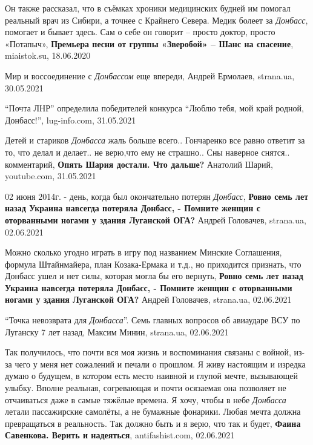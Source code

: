 
 
 
 
 

Он также рассказал, что в съёмках хроники медицинских будней им помогал
реальный врач из Сибири, а точнее с Крайнего Севера. Медик болеет за
\emph{Донбасс}, помогает и бывает здесь. Сам о себе он говорит – просто доктор,
просто «Потапыч», \textbf{Премьера песни от группы «Зверобой» – Шанс на
спасение}, miaistok.su, 18.06.2020

Мир и воссоединение с \emph{Донбассом} еще впереди, Андрей Ермолаев, strana.ua,
30.05.2021

\enquote{Почта ЛНР} определила победителей конкурса \enquote{Люблю тебя, мой
край родной, Донбасс!}, lug-info.com, 31.05.2021

Детей и стариков \emph{Донбасса} жаль больше всего.. Гончаренко все равно ответит за
то, что делал и делает.. не верю,что ему не страшно.. Сны наверное снятся..
комментарий, \textbf{Опять Шария достали. Что дальше?} Анатолий Шарий, youtube.com, 31.05.2021

02 июня 2014г. - день, когда был окончательно потерян \emph{Донбасс},
\textbf{Ровно семь лет назад Украина навсегда потеряла Донбасс, - Помните женщин с оторванными ногами у здания Луганской ОГА?} 
Андрей Головачев, strana.ua, 02.06.2021

Можно сколько угодно играть в игру под названием Минские Соглашения, формула
Штайнмайера, план Козака-Ермака и т.д., но приходится признать, что Донбасс
ушел и нет силы, которая могла бы его вернуть,
\textbf{Ровно семь лет назад Украина навсегда потеряла Донбасс, - Помните женщин с оторванными ногами у здания Луганской ОГА?} 
Андрей Головачев, strana.ua, 02.06.2021

\enquote{Точка невозврата для \emph{Донбасса}}. Семь главных вопросов об авиаударе ВСУ по Луганску 7 лет назад,
Максим Минин, strana.ua, 02.06.2021

Так получилось, что почти вся моя жизнь и воспоминания связаны с войной, из-за
чего у меня нет сожалений и печали о прошлом. Я живу настоящим и изредка думаю
о будущем, в котором есть место наивной и глупой мечте, вызывающей улыбку.
Вполне реальная, согревающая и почти осязаемая она позволяет не отчаиваться
даже в самые тяжёлые времена. Я хочу, чтобы в небе \emph{Донбасса} летали пассажирские
самолёты, а не бумажные фонарики. Любая мечта должна превращаться в реальность.
Так должно быть и я верю, что так и будет,
\textbf{Фаина Савенкова. Верить и надеяться}, antifashist.com, 02.06.2021


